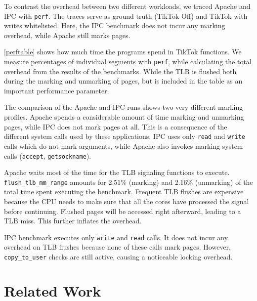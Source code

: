 \documentclass[conference]{IEEEtran}
\newcommand{\sysname}{TikTok}
\begin{document}
To contrast the overhead between two different workloads, we traced Apache and IPC
with \texttt{perf}. The traces serve as ground truth
(\sysname{} Off) and \sysname{} with writes whitelisted. Here, the IPC benchmark
does not incur any marking overhead, while Apache still marks pages.

\autoref{perftable} shows how much time the programs spend in
\sysname{} functions. We measure percentages of individual segments with
\texttt{perf}, while calculating the total overhead from the results of the
benchmarks. While the TLB is flushed both during the marking and unmarking of
pages, but is included in the table as an important performance parameter.

The comparison of the Apache and IPC runs shows two very different marking
profiles. Apache spends a considerable amount of time marking and unmarking
pages, while IPC does not mark pages at all. This is a consequence of the
different system calls used by these applications. IPC uses only \texttt{read}
and \texttt{write} calls which do not mark arguments, while Apache also invokes
marking system calls (\texttt{accept}, \texttt{getsockname}).

Apache waits most of the time for the TLB signaling functions to execute.
\texttt{flush\_tlb\_mm\_range} amounts for 2.51\% (marking) and 2.16\%
(unmarking) of the total time spent executing the benchmark. Frequent TLB
flushes are expensive because the CPU needs to make sure that all the cores have
processed the signal before continuing. Flushed pages will be accessed right
afterward, leading to a TLB miss. This further inflates the overhead.

IPC benchmark executes only \texttt{write} and \texttt{read} calls. It does not
incur any overhead on TLB flushes because none of these calls mark pages.
However, \texttt{copy\_to\_user} checks are still active, causing a noticeable
locking overhead.


\section{Related Work}
\label{sec:relatedwork}
\end{document}
